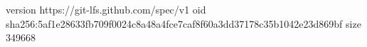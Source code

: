 version https://git-lfs.github.com/spec/v1
oid sha256:5af1e28633fb709f0024c8a48a4fce7caf8f60a3dd37178c35b1042e23d869bf
size 349668
